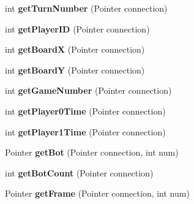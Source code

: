 \begin{DoxyCompactItemize}
\item 
\hypertarget{interfaceClient_a1c180b84ed7e74644ac62c1e069e26de}{
int {\bfseries getTurnNumber} (Pointer connection)}
\label{interfaceClient_a1c180b84ed7e74644ac62c1e069e26de}

\item 
\hypertarget{interfaceClient_a45ca933e037a2fa5ce4f97e67eb8b62f}{
int {\bfseries getPlayerID} (Pointer connection)}
\label{interfaceClient_a45ca933e037a2fa5ce4f97e67eb8b62f}

\item 
\hypertarget{interfaceClient_a56e0aaa3fd52c14ec34d8170115657fa}{
int {\bfseries getBoardX} (Pointer connection)}
\label{interfaceClient_a56e0aaa3fd52c14ec34d8170115657fa}

\item 
\hypertarget{interfaceClient_aa666bdd937baa207e339ba65bd126788}{
int {\bfseries getBoardY} (Pointer connection)}
\label{interfaceClient_aa666bdd937baa207e339ba65bd126788}

\item 
\hypertarget{interfaceClient_a172426923fb5bd5bdf79a3a3b6caf2e1}{
int {\bfseries getGameNumber} (Pointer connection)}
\label{interfaceClient_a172426923fb5bd5bdf79a3a3b6caf2e1}

\item 
\hypertarget{interfaceClient_a1f16fbd34fbdee312db08c06d996b98b}{
int {\bfseries getPlayer0Time} (Pointer connection)}
\label{interfaceClient_a1f16fbd34fbdee312db08c06d996b98b}

\item 
\hypertarget{interfaceClient_a2996321a7d00f9179b4bf2b5e7b15665}{
int {\bfseries getPlayer1Time} (Pointer connection)}
\label{interfaceClient_a2996321a7d00f9179b4bf2b5e7b15665}

\item 
\hypertarget{interfaceClient_a8f3720d04d10401b54abd7246cbb9ea3}{
Pointer {\bfseries getBot} (Pointer connection, int num)}
\label{interfaceClient_a8f3720d04d10401b54abd7246cbb9ea3}

\item 
\hypertarget{interfaceClient_a00a1eacedd62d95a9d1c48469e88ed98}{
int {\bfseries getBotCount} (Pointer connection)}
\label{interfaceClient_a00a1eacedd62d95a9d1c48469e88ed98}

\item 
\hypertarget{interfaceClient_abe68fcdd837fcab17168765b267bd7f8}{
Pointer {\bfseries getFrame} (Pointer connection, int num)}
\label{interfaceClient_abe68fcdd837fcab17168765b267bd7f8}


\end{DoxyCompactItemize}
